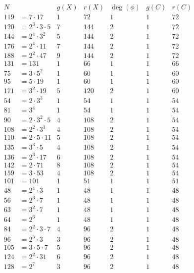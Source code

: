 \documentclass{amsart}
\numberwithin{equation}{section}
\theoremstyle{definition}
\begin{document}
\begin{table}[ht]
	\[
	\begin{array}{|rl|c|r|r|c|r|}
		\hline
		N & & g(X) & r(X) & \deg(\phi) & g(C) & r(C)\\
		\hline
		119&= 7 \cdot 17 & 1 & 72 & 1 & 1 & 72 \\
		120&= 2^{3} \cdot 3 \cdot 5 & 7 & 144 & 2 & 1 & 72 \\
		144&= 2^{4} \cdot 3^{2} & 5 & 144 & 2 & 1 & 72 \\
		176&= 2^{4} \cdot 11 & 7 & 144 & 2 & 1 & 72 \\
		188&= 2^{2} \cdot 47 & 9 & 144 & 2 & 1 & 72 \\
		131&= 131 & 1 & 66 & 1 & 1 & 66 \\
		75&= 3 \cdot 5^{2} & 1 & 60 & 1 & 1 & 60 \\
		95&= 5 \cdot 19 & 1 & 60 & 1 & 1 & 60 \\
		171&= 3^{2} \cdot 19 & 5 & 120 & 2 & 1 & 60 \\
		54&= 2 \cdot 3^{3} & 1 & 54 & 1 & 1 & 54 \\
		81&= 3^{4} & 1 & 54 & 1 & 1 & 54 \\
		90&= 2 \cdot 3^{2} \cdot 5 & 4 & 108 & 2 & 1 & 54 \\
		108&= 2^{2} \cdot 3^{3} & 4 & 108 & 2 & 1 & 54 \\
		110&= 2 \cdot 5 \cdot 11 & 5 & 108 & 2 & 1 & 54 \\
		135&= 3^{3} \cdot 5 & 4 & 108 & 2 & 1 & 54 \\
		136&= 2^{3} \cdot 17 & 6 & 108 & 2 & 1 & 54 \\
		142&= 2 \cdot 71 & 8 & 108 & 2 & 1 & 54 \\
		159&= 3 \cdot 53 & 4 & 108 & 2 & 1 & 54 \\
		101&= 101 & 1 & 51 & 1 & 1 & 51 \\
		48&= 2^{4} \cdot 3 & 1 & 48 & 1 & 1 & 48 \\
		56&= 2^{3} \cdot 7 & 1 & 48 & 1 & 1 & 48 \\
		63&= 3^{2} \cdot 7 & 1 & 48 & 1 & 1 & 48 \\
		64&= 2^{6} & 1 & 48 & 1 & 1 & 48 \\
		84&= 2^{2} \cdot 3 \cdot 7 & 4 & 96 & 2 & 1 & 48 \\
		96&= 2^{5} \cdot 3 & 3 & 96 & 2 & 1 & 48 \\
		105&= 3 \cdot 5 \cdot 7 & 5 & 96 & 2 & 1 & 48 \\
		124&= 2^{2} \cdot 31 & 6 & 96 & 2 & 1 & 48 \\
		128&= 2^{7} & 3 & 96 & 2 & 1 & 48 \\

\end{array}\]
\end{table}
\end{document}
